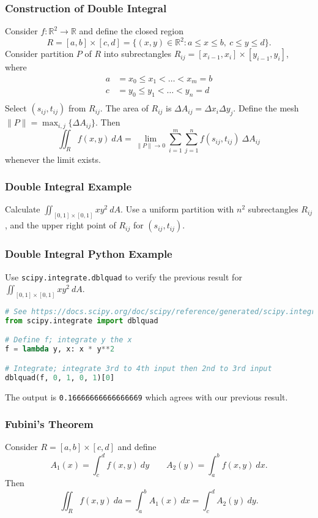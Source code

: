 \documentclass{beamer}
\begin{document}
\begin{frame}
\frametitle{Construction of Double Integral}
\tiny
Consider $f:\mathbb{R}^2\to\mathbb{R}$ and define the closed region
$$
R = [a, b]\times [c, d] = \{(x, y)\in\mathbb{R}^2: a\leq x\leq b,\ c\leq y\leq d\}.
$$
Consider partition $P$ of $R$ into subrectangles $R_{ij} = [x_{i - 1}, x_i]\times [y_{i - 1}, y_i]$, where
\begin{align*}
a &= x_0 \leq x_1 < \ldots < x_m = b\\
c &= y_0 \leq y_1 < \ldots < y_n = d\\
\end{align*}
Select $(s_{ij}, t_{ij})$ from $R_{ij}$. The area of $R_{ij}$ is $\Delta A_{ij} = \Delta x_i\Delta y_j$. Define the mesh $\|P\| = \max_{i, j}\{\Delta A_{ij}\}$. Then
$$
\iint_R f(x, y)\ dA = \lim_{\|P\|\to 0} \sum_{i = 1}^m\sum_{j = 1}^n f(s_{ij}, t_{ij})\ \Delta A_{ij}
$$
whenever the limit exists.
\end{frame}

\begin{frame}[t]
\frametitle{Double Integral Example}
\begin{Example}
Calculate $\displaystyle\iint_{[0,1]\times[0, 1]} xy^2\ dA$. Use a uniform partition with $n^2$ subrectangles $R_{ij}$, and the upper right point of $R_{ij}$ for $(s_{ij}, t_{ij})$.
\end{Example}
\end{frame}

\begin{frame}[fragile]
\frametitle{Double Integral Python Example}
\small
\begin{Example}
Use \texttt{scipy.integrate.dblquad} to verify the previous result for $\displaystyle\iint_{[0,1]\times[0, 1]} xy^2\ dA$.
\end{Example}
\begin{lstlisting}[language=Python]
# See https://docs.scipy.org/doc/scipy/reference/generated/scipy.integrate.dblquad.html
from scipy.integrate import dblquad

# Define f; integrate y the x
f = lambda y, x: x * y**2

# Integrate; integrate 3rd to 4th input then 2nd to 3rd input
dblquad(f, 0, 1, 0, 1)[0]
\end{lstlisting}
The output is \texttt{0.16666666666666669} which agrees with our previous result. 

\end{frame}

\begin{frame}
\frametitle{Fubini's Theorem}
\begin{Theorem}[Fubini]
Consider $R = [a, b]\times [c, d]$ and define
$$
A_1(x) = \int_c^d f(x, y)\ dy\qquad A_2(y) = \int_a^b f(x, y)\ dx.
$$
Then
$$
\iint_R f(x, y)\ da = \int_a^b A_1(x)\ dx = \int_c^d A_2(y)\ dy.
$$
\end{Theorem}
\end{frame}
\end{document}
